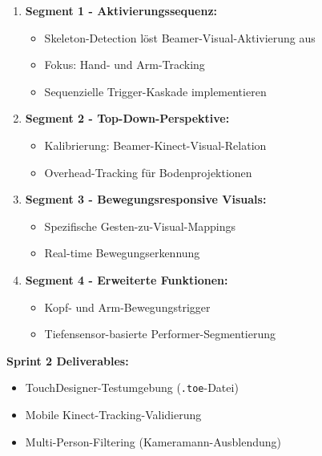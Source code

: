 \begin{enumerate}
    \item \textbf{Segment 1 - Aktivierungssequenz:}
    \begin{itemize}
        \item Skeleton-Detection löst Beamer-Visual-Aktivierung aus
        \item Fokus: Hand- und Arm-Tracking
        \item Sequenzielle Trigger-Kaskade implementieren
    \end{itemize}
    
    \item \textbf{Segment 2 - Top-Down-Perspektive:}
    \begin{itemize}
        \item Kalibrierung: Beamer-Kinect-Visual-Relation
        \item Overhead-Tracking für Bodenprojektionen
    \end{itemize}
    
    \item \textbf{Segment 3 - Bewegungsresponsive Visuals:}
    \begin{itemize}
        \item Spezifische Gesten-zu-Visual-Mappings
        \item Real-time Bewegungserkennung
    \end{itemize}
    
    \item \textbf{Segment 4 - Erweiterte Funktionen:}
    \begin{itemize}
        \item Kopf- und Arm-Bewegungstrigger
        \item Tiefensensor-basierte Performer-Segmentierung
    \end{itemize}
\end{enumerate}

\textbf{Sprint 2 Deliverables:}
\begin{itemize}
    \item TouchDesigner-Testumgebung (\texttt{.toe}-Datei)
    \item Mobile Kinect-Tracking-Validierung
    \item Multi-Person-Filtering (Kameramann-Ausblendung)
\end{itemize}